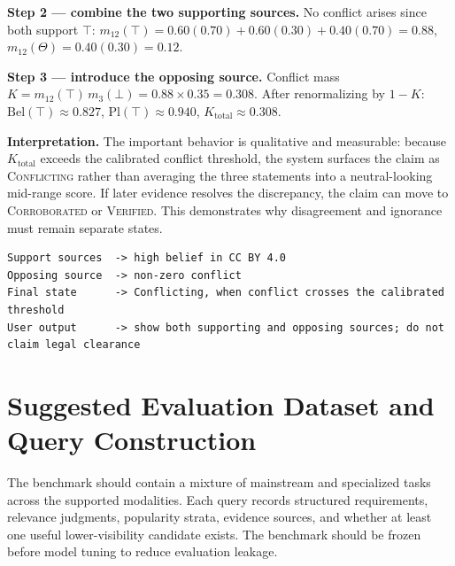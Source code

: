\documentclass[11pt]{article}
\begin{document}
\textbf{Step 2 --- combine the two supporting sources.} No conflict arises since both support $\top$:
$m_{12}(\top) = 0.60(0.70) + 0.60(0.30) + 0.40(0.70) = 0.88$, \quad $m_{12}(\Theta) = 0.40(0.30) = 0.12$.

\textbf{Step 3 --- introduce the opposing source.} Conflict mass
$K = m_{12}(\top)\,m_3(\bot) = 0.88 \times 0.35 = 0.308$. After renormalizing by $1-K$:
$\mathrm{Bel}(\top) \approx 0.827$, $\mathrm{Pl}(\top) \approx 0.940$, $K_{\text{total}} \approx 0.308$.

\textbf{Interpretation.} The important behavior is qualitative and measurable: because $K_{\text{total}}$
exceeds the calibrated conflict threshold, the system surfaces the claim as \textsc{Conflicting} rather
than averaging the three statements into a neutral-looking mid-range score. If later evidence resolves the
discrepancy, the claim can move to \textsc{Corroborated} or \textsc{Verified}. This demonstrates why
disagreement and ignorance must remain separate states.

\begin{lstlisting}[basicstyle=\ttfamily\footnotesize]
Support sources  -> high belief in CC BY 4.0
Opposing source  -> non-zero conflict
Final state      -> Conflicting, when conflict crosses the calibrated threshold
User output      -> show both supporting and opposing sources; do not claim legal clearance
\end{lstlisting}

\section{Suggested Evaluation Dataset and Query Construction}
The benchmark should contain a mixture of mainstream and specialized tasks across the supported modalities.
Each query records structured requirements, relevance judgments, popularity strata, evidence sources, and
whether at least one useful lower-visibility candidate exists. The benchmark should be frozen before model
tuning to reduce evaluation leakage.
\end{document}
